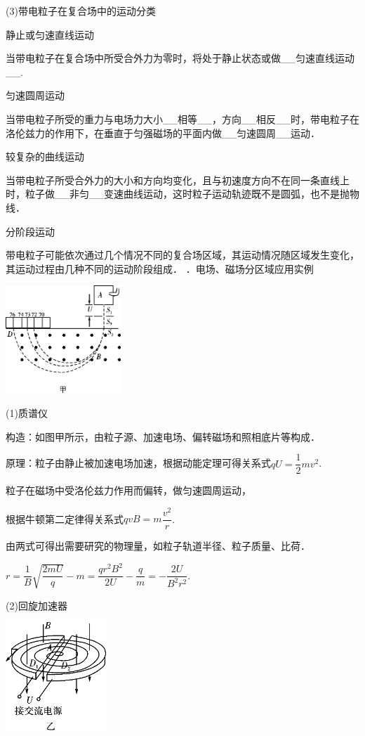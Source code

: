\documentclass[cn,10.5pt,chinese,mac,chinesefont=founder]{elegantbook}
\begin{document}
(3)带电粒子在复合场中的运动分类

静止或匀速直线运动

当带电粒子在复合场中所受合外力为零时，将处于静止状态或做\_\_匀速直线运动\_\_.

匀速圆周运动

当带电粒子所受的重力与电场力大小\_\_相等\_\_，方向\_\_相反\_\_时，带电粒子在洛伦兹力的作用下，在垂直于匀强磁场的平面内做\_\_匀速圆周\_\_运动．

较复杂的曲线运动

当带电粒子所受合外力的大小和方向均变化，且与初速度方向不在同一条直线上时，粒子做\_\_非匀\_\_变速曲线运动，这时粒子运动轨迹既不是圆弧，也不是抛物线．

分阶段运动

带电粒子可能依次通过几个情况不同的复合场区域，其运动情况随区域发生变化，其运动过程由几种不同的运动阶段组成．
．电场、磁场分区域应用实例

\begin{center}\includegraphics[width=1.70764in,height=1.59444in]{media/image369.png}\end{center}

(1)质谱仪

构造：如图甲所示，由粒子源、加速电场、偏转磁场和照相底片等构成．

原理：粒子由静止被加速电场加速，根据动能定理可得关系式$q U=\dfrac{1}{2} m v^{2}$.

粒子在磁场中受洛伦兹力作用而偏转，做匀速圆周运动，

根据牛顿第二定律得关系式$q v B=m \dfrac{v^{2}}{r}$.

由两式可得出需要研究的物理量，如粒子轨道半径、粒子质量、比荷．

$r=\dfrac{1}{B} \sqrt{\dfrac{2 m U}{q}}-m=\dfrac{q r^{2} B^{2}}{2 U}-\dfrac{q}{m}=-\dfrac{2 U}{B^{2} r^{2}}$.

(2)回旋加速器

\begin{center}\includegraphics[width=1.49028in,height=1.59931in]{media/image370.png}\end{center}
\end{document}
